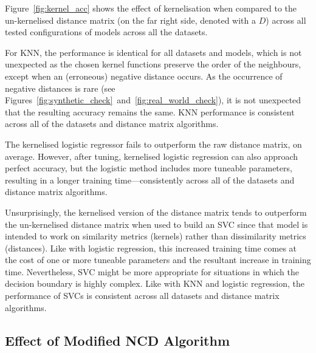 \documentclass[preprint,12pt]{elsarticle}
\begin{document}
Figure~\ref{fig:kernel_acc} shows the effect of kernelisation when compared to the un-kernelised distance matrix (on the far right side, denoted with a $D$) across all tested configurations of models across all the datasets. 

For KNN, the performance is identical for all datasets and models, which is not unexpected as the chosen kernel functions preserve the order of the neighbours, except when an (erroneous) negative distance occurs. 
As the occurrence of negative distances is rare (see Figures~\ref{fig:synthetic_check}~and~\ref{fig:real_world_check}), it is not unexpected that the resulting accuracy remains the same. 
KNN performance is consistent across all of the datasets and distance matrix algorithms.

The kernelised logistic regressor fails to outperform the raw distance matrix, on average. 
However, after tuning, kernelised logistic regression can also approach perfect accuracy, but the logistic method includes more tuneable parameters, resulting in a longer training time---consistently across all of the datasets and distance matrix algorithms.

Unsurprisingly, the kernelised version of the distance matrix tends to outperform the un-kernelised distance matrix when used to build an SVC since that model is intended to work on similarity metrics (kernels) rather than dissimilarity metrics (distances). 
Like with logistic regression, this increased training time comes at the cost of one or more tuneable parameters and the resultant increase in training time. 
Nevertheless, SVC might be more appropriate for situations in which the decision boundary is highly complex. 
Like with KNN and logistic regression, the performance of SVCs is consistent across all datasets and distance matrix algorithms. 


\subsection{Effect of Modified NCD Algorithm}
\end{document}

